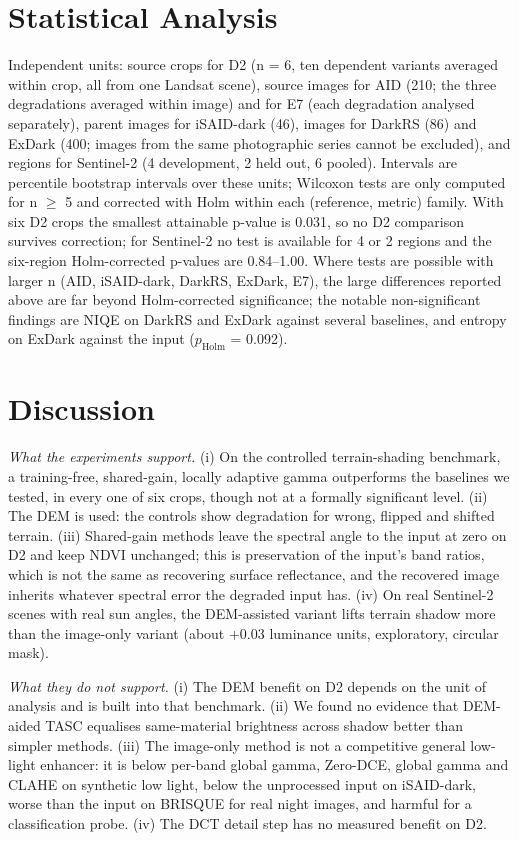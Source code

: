 \documentclass[conference]{IEEEtran}
\begin{document}
\section{Statistical Analysis}
Independent units: source crops for D2 (n = 6, ten dependent variants averaged within crop, all from one Landsat scene), source images for AID (210; the three degradations averaged within image) and for E7 (each degradation analysed separately), parent images for iSAID-dark (46), images for DarkRS (86) and ExDark (400; images from the same photographic series cannot be excluded), and regions for Sentinel-2 (4 development, 2 held out, 6 pooled). Intervals are percentile bootstrap intervals over these units; Wilcoxon tests are only computed for n $\geq$ 5 and corrected with Holm within each (reference, metric) family. With six D2 crops the smallest attainable p-value is 0.031, so no D2 comparison survives correction; for Sentinel-2 no test is available for 4 or 2 regions and the six-region Holm-corrected p-values are 0.84--1.00. Where tests are possible with larger n (AID, iSAID-dark, DarkRS, ExDark, E7), the large differences reported above are far beyond Holm-corrected significance; the notable non-significant findings are NIQE on DarkRS and ExDark against several baselines, and entropy on ExDark against the input ($p_{\mathrm{Holm}}$ = 0.092).

\section{Discussion}
\emph{What the experiments support.} (i) On the controlled terrain-shading benchmark, a training-free, shared-gain, locally adaptive gamma outperforms the baselines we tested, in every one of six crops, though not at a formally significant level. (ii) The DEM is used: the controls show degradation for wrong, flipped and shifted terrain. (iii) Shared-gain methods leave the spectral angle to the input at zero on D2 and keep NDVI unchanged; this is preservation of the input's band ratios, which is not the same as recovering surface reflectance, and the recovered image inherits whatever spectral error the degraded input has. (iv) On real Sentinel-2 scenes with real sun angles, the DEM-assisted variant lifts terrain shadow more than the image-only variant (about +0.03 luminance units, exploratory, circular mask).

\emph{What they do not support.} (i) The DEM benefit on D2 depends on the unit of analysis and is built into that benchmark. (ii) We found no evidence that DEM-aided TASC equalises same-material brightness across shadow better than simpler methods. (iii) The image-only method is not a competitive general low-light enhancer: it is below per-band global gamma, Zero-DCE, global gamma and CLAHE on synthetic low light, below the unprocessed input on iSAID-dark, worse than the input on BRISQUE for real night images, and harmful for a classification probe. (iv) The DCT detail step has no measured benefit on D2.
\end{document}
